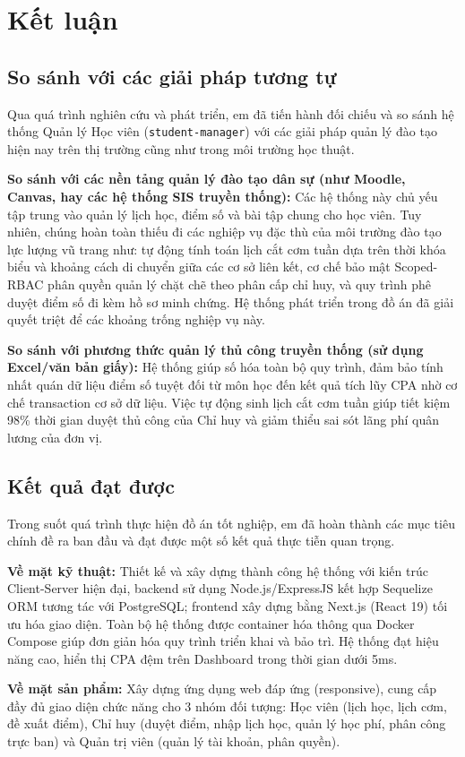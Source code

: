 \documentclass[../DoAn.tex]{subfiles}
\begin{document}
\section{Kết luận}

\subsection{So sánh với các giải pháp tương tự}
Qua quá trình nghiên cứu và phát triển, em đã tiến hành đối chiếu và so sánh hệ thống Quản lý Học viên (\texttt{student-manager}) với các giải pháp quản lý đào tạo hiện nay trên thị trường cũng như trong môi trường học thuật.
\par
\textbf{So sánh với các nền tảng quản lý đào tạo dân sự (như Moodle, Canvas, hay các hệ thống SIS truyền thống):} Các hệ thống này chủ yếu tập trung vào quản lý lịch học, điểm số và bài tập chung cho học viên. Tuy nhiên, chúng hoàn toàn thiếu đi các nghiệp vụ đặc thù của môi trường đào tạo lực lượng vũ trang như: tự động tính toán lịch cắt cơm tuần dựa trên thời khóa biểu và khoảng cách di chuyển giữa các cơ sở liên kết, cơ chế bảo mật Scoped-RBAC phân quyền quản lý chặt chẽ theo phân cấp chỉ huy, và quy trình phê duyệt điểm số đi kèm hồ sơ minh chứng. Hệ thống phát triển trong đồ án đã giải quyết triệt để các khoảng trống nghiệp vụ này.
\par
\textbf{So sánh với phương thức quản lý thủ công truyền thống (sử dụng Excel/văn bản giấy):} Hệ thống giúp số hóa toàn bộ quy trình, đảm bảo tính nhất quán dữ liệu điểm số tuyệt đối từ môn học đến kết quả tích lũy CPA nhờ cơ chế transaction cơ sở dữ liệu. Việc tự động sinh lịch cắt cơm tuần giúp tiết kiệm 98\% thời gian duyệt thủ công của Chỉ huy và giảm thiểu sai sót lãng phí quân lương của đơn vị.

\subsection{Kết quả đạt được}
Trong suốt quá trình thực hiện đồ án tốt nghiệp, em đã hoàn thành các mục tiêu chính đề ra ban đầu và đạt được một số kết quả thực tiễn quan trọng.
\par
\textbf{Về mặt kỹ thuật:} Thiết kế và xây dựng thành công hệ thống với kiến trúc Client-Server hiện đại, backend sử dụng Node.js/ExpressJS kết hợp Sequelize ORM tương tác với PostgreSQL; frontend xây dựng bằng Next.js (React 19) tối ưu hóa giao diện. Toàn bộ hệ thống được container hóa thông qua Docker Compose giúp đơn giản hóa quy trình triển khai và bảo trì. Hệ thống đạt hiệu năng cao, hiển thị CPA đệm trên Dashboard trong thời gian dưới 5ms.
\par
\textbf{Về mặt sản phẩm:} Xây dựng ứng dụng web đáp ứng (responsive), cung cấp đầy đủ giao diện chức năng cho 3 nhóm đối tượng: Học viên (lịch học, lịch cơm, đề xuất điểm), Chỉ huy (duyệt điểm, nhập lịch học, quản lý học phí, phân công trực ban) và Quản trị viên (quản lý tài khoản, phân quyền).
\end{document}
